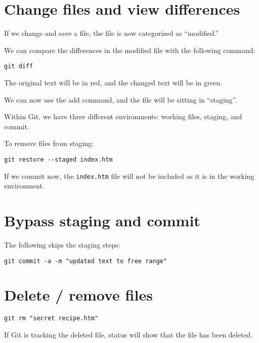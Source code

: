 \documentclass[12pt]{article}
\begin{document}
\section{Change files and view differences}
If we change and save a file, the file is now categorized as ``modified.''\par
We can compare the differences in the modified file with the following command:
\begin{Verbatim}
git diff
\end{Verbatim}
The original text will be in red, and the changed text will be in green.\par
We can now use the add command, and the file will be sitting in ``staging''.\par
Within Git, we have three different environments: working files, staging, and commit.
\begin{figure}[h!]
\centering
{}
\end{figure}
\par
To remove files from staging:
\begin{Verbatim}
git restore --staged index.htm
\end{Verbatim}
If we commit now, the \verb|index.htm| file will not be included as it is in the working environment.


\section{Bypass staging and commit}
The following skips the staging steps:
\begin{Verbatim}
git commit -a -m "updated text to free range"
\end{Verbatim}
\section{Delete / remove files}
\begin{Verbatim}
git rm "secret recipe.htm"
\end{Verbatim}
If Git is tracking the deleted file, status will show that the file has been deleted.
\end{document}
